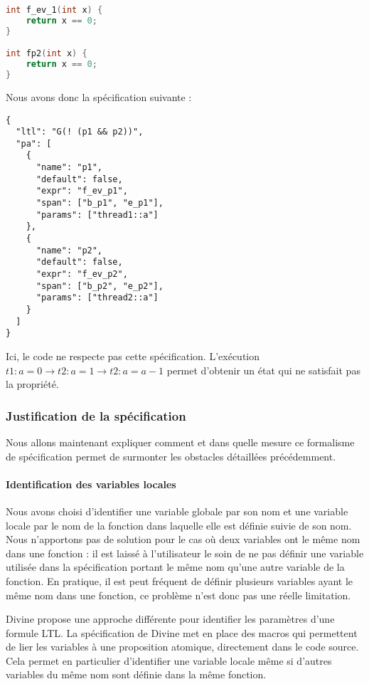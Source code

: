 \begin{lstlisting}[language=C]
int f_ev_1(int x) {
    return x == 0;
}

int fp2(int x) {
    return x == 0;
}
\end{lstlisting}

Nous avons donc la spécification suivante :

\begin{lstlisting}
{
  "ltl": "G(! (p1 && p2))",
  "pa": [
    {
      "name": "p1",
      "default": false,
      "expr": "f_ev_p1",
      "span": ["b_p1", "e_p1"],
      "params": ["thread1::a"]
    },
    {
      "name": "p2",
      "default": false,
      "expr": "f_ev_p2",
      "span": ["b_p2", "e_p2"],
      "params": ["thread2::a"]
    }
  ]
}
\end{lstlisting}

Ici, le code ne respecte pas cette spécification. L'exécution
\(t1: a = 0 \rightarrow t2: a = 1 \rightarrow t2: a = a - 1\) permet
d'obtenir un état qui ne satisfait pas la propriété.

\subsubsection{Justification de la spécification}

Nous allons maintenant expliquer comment et dans quelle mesure ce formalisme
de spécification permet de surmonter les obstacles détaillées précédemment.

\paragraph{Identification des variables locales}

Nous avons choisi d'identifier une variable globale par son nom et une
variable locale par le nom de la fonction dans laquelle elle est définie
suivie de son nom. Nous n'apportons pas de solution pour le cas où deux
variables ont le même nom dans une fonction : il est laissé à
l'utilisateur le soin de ne pas définir une variable utilisée dans la
spécification portant le même nom qu'une autre variable de la fonction.
En pratique, il est peut fréquent de définir plusieurs variables ayant le
même nom dans une fonction, ce problème n'est donc pas une réelle
limitation.

Divine \cite{Divine_LTL} propose une approche différente pour
identifier les paramètres d'une formule LTL. La spécification de Divine
met en place des macros qui permettent de lier les variables à une
proposition atomique, directement dans le code source. Cela permet en
particulier d'identifier une variable locale même si d'autres variables
du même nom sont définie dans la même fonction.


